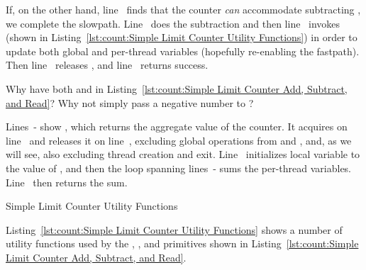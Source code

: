 \begin{lineref}
If, on the other hand, line~ finds that the counter \emph{can}
accommodate subtracting , we complete the slowpath.
Line~ does the subtraction and then
line~ invokes  (shown in
Listing~\ref{lst:count:Simple Limit Counter Utility Functions})
in order to update both global and per-thread variables
(hopefully re-enabling the fastpath).
Then line~ releases , and
line~ returns success.
\end{lineref}

\QuickQuiz{}
	Why have both  and  in
	Listing~\ref{lst:count:Simple Limit Counter Add, Subtract, and Read}?
	Why not simply pass a negative number to ?
 \QuickQuizEnd

\begin{lineref}
Lines~- show ,
which returns the aggregate value
of the counter.
It acquires  on line~
and releases it on line~,
excluding global operations from  and ,
and, as we will see, also excluding thread creation and exit.
Line~ initializes local variable  to the value of
, and then the loop spanning
lines~- sums the
per-thread  variables.
Line~ then returns the sum.
\end{lineref}

\begin{listing}[tbp]

\caption{Simple Limit Counter Utility Functions}
\label{lst:count:Simple Limit Counter Utility Functions}
\end{listing}

Listing~\ref{lst:count:Simple Limit Counter Utility Functions}
shows a number of utility functions used by the ,
, and  primitives shown in
Listing~\ref{lst:count:Simple Limit Counter Add, Subtract, and Read}.

